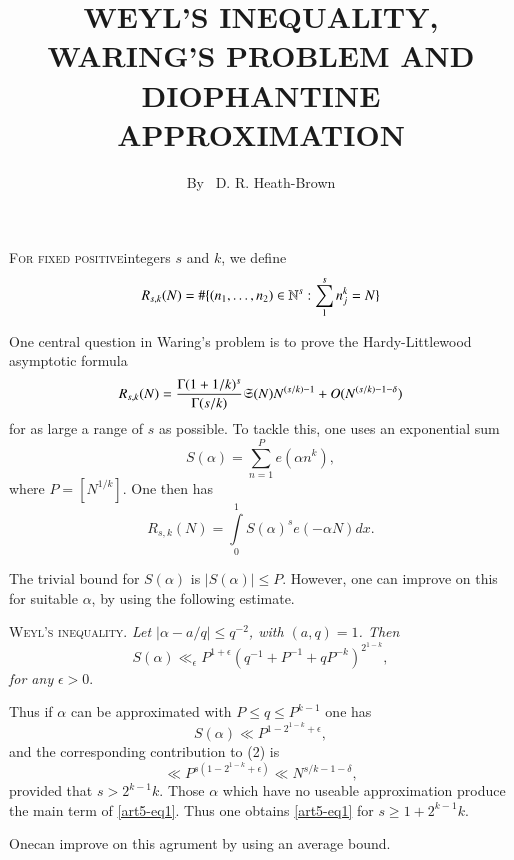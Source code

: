 
\title{WEYL'S INEQUALITY, WARING'S PROBLEM AND DIOPHANTINE APPROXIMATION}

\author{By~  D. R. Heath-Brown}

\date{}
\maketitle

\setcounter{page}{45} 
\setcounter{pageoriginal}{40} 


\textsc{For fixed positive}\pageoriginale integers $s$ and $k$, we define
$$
R_{s,k} (N) = \# \{(n_1, \ldots, n_2) \in \mathbb{N}^s : \sum\limits^s_1 n^k_j = N\}
$$

One central question in Waring's problem is to prove the Hardy-Littlewood asymptotic formula
\begin{equation}
R_{s,k} (N) = \frac{\Gamma (1+1/k)^s}{\Gamma (s/k)} \mathfrak{S} (N) N^{(s/k) -1} + O (N^{(s/k) -1 - \delta}) 
\label{art5-eq1}
\end{equation}
for as large a range of $s$ as possible. To tackle this, one uses an exponential sum
$$
S (\alpha) = \sum\limits^P_{n=1} e(\alpha n^k),
$$
where $P= [N^{1/k}]$. One then has
\begin{equation}
R_{s,k} (N) = \int\limits^1_0 S (\alpha)^s e(-\alpha N) dx.  \label{art5-eq2}
\end{equation}

The trivial bound for $S(\alpha)$ is $|S(\alpha)| \leqslant P$. However, one can improve on this for suitable $\alpha$, by using the following estimate.

\noindent
\textsc{Weyl's inequality}. \textit{Let $|\alpha - a/q| \leqslant q^{-2}$, with $(a, q) =1$. Then }
$$
S(\alpha) \ll_\epsilon P^{1+\epsilon} (q^{-1} + P^{-1} + qP^{-k})^{2^{1-k}},
$$
\textit{for any  } $\epsilon >0$.

Thus if $\alpha$ can be approximated with $P\leqslant q \leqslant P^{k-1}$ one has 
\begin{equation}
S (\alpha) \ll P^{1-2^{1-k} + \epsilon}, \label{art5-eq3}
\end{equation}
and the corresponding contribution to (2) is
$$
\ll P^{s(1-2^{1-k} +\epsilon)} \ll N^{s/k -1-\delta}, 
$$
provided that $s > 2^{k-1} k$. Those $\alpha$ which have no useable approximation produce the main term of \eqref{art5-eq1}. Thus one obtains \eqref{art5-eq1} for $s \geqslant 1+ 2^{k-1} k$.

One\pageoriginale can improve on this agrument by using an average bound. 

